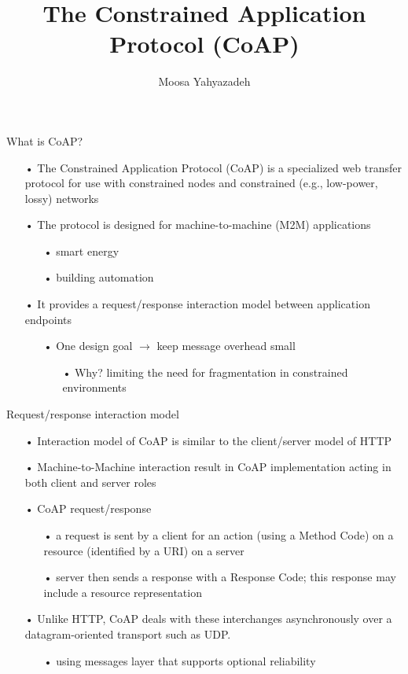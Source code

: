 \documentclass[11pt]{beamer}
\author{Moosa Yahyazadeh}
\title{The Constrained Application Protocol (CoAP)}
\institute{The University of Iowa}
\begin{document}
\begin{frame}
\titlepage
\end{frame}
\begin{frame}{What is CoAP?}
\begin{itemize}
\item[•] The Constrained Application Protocol (CoAP) is a specialized web transfer protocol for use with constrained nodes and constrained (e.g., low-power, lossy) networks
\item[•] The protocol is designed for machine-to-machine (M2M) applications
\begin{itemize}
\item[•] smart energy
\item[•] building automation
\end{itemize}
\item[•] It provides a request/response interaction model between application endpoints
\begin{itemize}
\item[•] One design goal $\rightarrow$ keep message overhead small
\begin{itemize}
\item[•] Why? limiting the need for fragmentation in constrained environments
\end{itemize}
\end{itemize}
\end{itemize}
\end{frame}
\begin{frame}{Request/response interaction model}
\begin{itemize}
\item[•] Interaction model of CoAP is similar to the client/server model of HTTP
\item[•] Machine-to-Machine interaction result in CoAP implementation acting in both client and server roles
\item[•] CoAP request/response
\begin{itemize}
\item[•] a request is sent by a client for an action (using a Method Code) on a resource (identified by a URI) on a server
\item[•] server then sends a response with a Response Code; this response may include a resource representation
\end{itemize}
\item[•] Unlike HTTP, CoAP deals with these interchanges asynchronously over a datagram-oriented transport such as UDP.
\begin{itemize}
\item[•] using messages layer that supports optional reliability
\end{itemize}
\end{itemize}
\end{frame}
\end{document}
